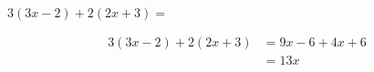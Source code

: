  $3(3x - 2) + 2(2x + 3) =$

\begin{solutionbox}{2.5cm}
    \begin{align*}
        3(3x - 2) + 2(2x + 3) & =9x-6+4x+6 \\
                              & =13x
    \end{align*}
\end{solutionbox}
